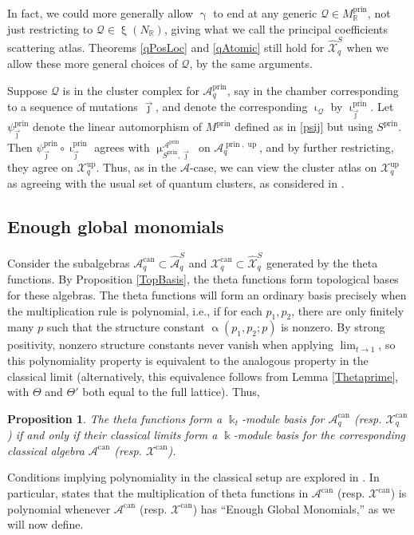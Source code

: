 \documentclass{amsart}
\DeclareMathOperator{\prin}{prin}
\DeclareMathOperator{\up}{up}
\DeclareMathOperator{\can}{can}
\let\bb=\mathbb
\let\rar=\rightarrow
\let\s=\mathcal
\let\wh=\widehat
\newcommand {\kk} {\Bbbk}
\newcommand {\kt} {\kk_t}
\newcommand {\sQ} {\mathcal{Q}}
\newcommand {\jj} {\vec{\jmath}}
\renewcommand{\iota}{\upiota}
\renewcommand{\alpha}{\upalpha}
\renewcommand{\gamma}{\upgamma}
\renewcommand{\xi}{\upxi}
\renewcommand{\mu}{\upmu}
\theoremstyle{plain}%
\newtheorem{prop}[thm]{Proposition}
\theoremstyle{definition}
\theoremstyle{remark}
\begin{document}
In fact, we could more generally allow $\gamma$ to end at any generic $\sQ\in M_{\bb{R}}^{\prin}$, not just restricting to $\sQ\in \xi(N_{\bb{R}})$, giving what we call the principal coefficients scattering atlas.  Theorems \ref{qPosLoc} and \ref{qAtomic} still hold for $\wh{\s{X}}_q^S$ when we allow these more general choices of $\sQ$, by the same arguments. 

Suppose $\sQ$ is in the cluster complex for $\s{A}_q^{\prin}$, say in the chamber corresponding to a sequence of mutations $\jj$, and denote the corresponding $\iota_{\sQ}$ by $\iota_{\jj}^{\prin}$.  Let $\psi_{\jj}^{\prin}$ denote the linear automorphism of $M^{\prin}$ defined as in \eqref{psij} but using $S^{\prin}$.  Then $\psi_{\jj}^{\prin}\circ\iota^{\prin}_{\jj}$ agrees with $\mu_{S^{\prin},\jj}^{\s{A}^{\prin}}$ on $\s{A}_q^{\prin,\up}$, and by further restricting, they agree on $\s{X}_q^{\up}$.  Thus, as in the $\s{A}$-case, we can view the cluster atlas on $\s{X}_q^{\up}$ as agreeing with the usual set of quantum clusters, as considered in \cite{FG1}.


\subsection{Enough global monomials}\label{EGM}

Consider the subalgebras $\s{A}_q^{\can}\subset \wh{\s{A}}_q^S$ and $\s{X}_q^{\can} \subset \wh{\s{X}}_q^S$ generated by the theta functions.  By Proposition \ref{TopBasis}, the theta functions form topological bases for these algebras.  The theta functions will form an ordinary basis precisely when the multiplication rule is polynomial, i.e., if for each $p_1,p_2$, there are only finitely many $p$ such that the structure constant $\alpha(p_1,p_2;p)$ is nonzero.  By strong positivity, nonzero structure constants never vanish when applying $\lim_{t\rar 1}$, so this polynomiality property is equivalent to the analogous property in the classical limit (alternatively, this equivalence follows from Lemma \ref{Thetaprime}, with $\Theta$ and $\Theta'$ both equal to the full lattice).  Thus,
\begin{prop}\label{AXcan}
The theta functions form a $\kt$-module basis for $\s{A}_q^{\can}$ (resp. $\s{X}_q^{\can}$) if and only if their classical limits form a $\kk$-module basis for the corresponding classical algebra $\s{A}^{\can}$ (resp. $\s{X}^{\can}$).
\end{prop}
Conditions implying polynomiality in the classical setup are explored in \cite{GHKK}.  In particular, \cite[Thm. 0.12(1)]{GHKK} states that the multiplication of theta functions in $\s{A}^{\can}$ (resp. $\s{X}^{\can}$) is polynomial whenever $\s{A}^{\can}$ (resp. $\s{X}^{\can}$) has ``Enough Global Monomials,'' as we will now define.
\end{document}
